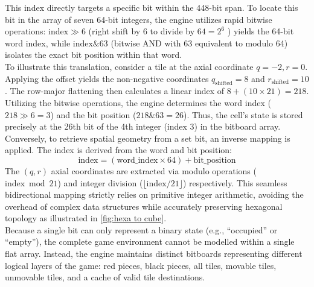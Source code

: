This index directly targets a specific bit within the 448-bit span. To locate this bit in the array of seven 64-bit integers, the engine utilizes rapid bitwise operations: $\text{index} \gg 6$ (right shift by 6 to divide by $64=2^6$ ) yields the 64-bit word index, while $\text{index} \mathbin{\&} 63$ (bitwise AND with 63 equivalent to modulo 64) isolates the exact bit position within that word.\\

To illustrate this translation, consider a tile at the axial coordinate $q = -2, r = 0$. Applying the offset yields the non-negative coordinates $q_{\text{shifted}} = 8$ and $r_{\text{shifted}} = 10$. The row-major flattening then calculates a linear index of $8 + (10 \times 21) = 218$. Utilizing the bitwise operations, the engine determines the word index ($218 \gg 6 = 3$) and the bit position ($218 \mathbin{\&} 63 = 26$). Thus, the cell's state is stored precisely at the 26th bit of the 4th integer (index 3) in the bitboard array.\\

Conversely, to retrieve spatial geometry from a set bit, an inverse mapping is applied. The index is derived from the word and bit position: $$ \text{index} = (\text{word\_index} \times 64) + \text{bit\_position} $$
The $(q, r)$ axial coordinates are extracted via modulo operations ($\text{index} \bmod 21$) and integer division ($\lfloor \text{index} / 21 \rfloor$) respectively. This seamless bidirectional mapping strictly relies on primitive integer arithmetic, avoiding the overhead of complex data structures while accurately preserving hexagonal topology as illustrated in \cref{fig:hexa to cube}.\\



Because a single bit can only represent a binary state (e.g., ``occupied'' or ``empty''), the complete game environment cannot be modelled within a single flat array. Instead, the engine maintains distinct bitboards representing different logical layers of the game: red pieces, black pieces, all tiles, movable tiles, unmovable tiles, and a cache of valid tile destinations.

